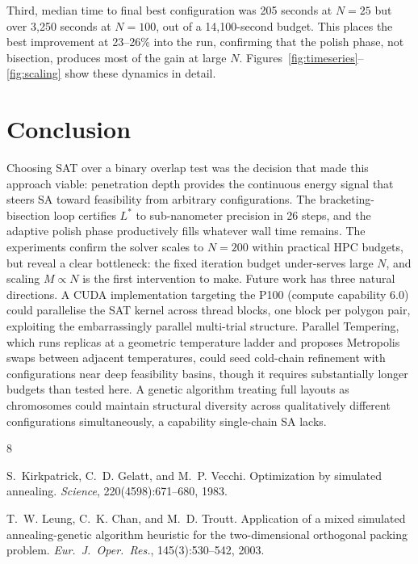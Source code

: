 \documentclass[10pt,twocolumn]{article}
\begin{document}
Third, median time to final best configuration was 205 seconds at
$N = 25$ but over 3{,}250 seconds at $N = 100$, out of a 14{,}100-second
budget. This places the best improvement at 23--26\% into the run,
confirming that the polish phase, not bisection, produces most of the
gain at large $N$. Figures~\ref{fig:timeseries}--\ref{fig:scaling}
show these dynamics in detail.

\section{Conclusion}
\label{sec:conclusion}

Choosing SAT over a binary overlap test was the decision that made this
approach viable: penetration depth provides the continuous energy
signal that steers SA toward feasibility from arbitrary configurations.
The bracketing-bisection loop certifies $L^*$ to sub-nanometer
precision in 26 steps, and the adaptive polish phase productively fills
whatever wall time remains. The experiments confirm the solver scales
to $N = 200$ within practical HPC budgets, but reveal a clear
bottleneck: the fixed iteration budget under-serves large $N$, and
scaling $M \propto N$ is the first intervention to make. Future work
has three natural directions. A CUDA implementation targeting the P100
(compute capability 6.0) could parallelise the SAT kernel across
thread blocks, one block per polygon pair, exploiting the
embarrassingly parallel multi-trial structure. Parallel Tempering,
which runs replicas at a geometric temperature ladder and proposes
Metropolis swaps between adjacent temperatures, could seed cold-chain
refinement with configurations near deep feasibility basins, though it
requires substantially longer budgets than tested here. A genetic
algorithm treating full layouts as chromosomes could maintain
structural diversity across qualitatively different configurations
simultaneously, a capability single-chain SA lacks.


\begin{thebibliography}{8}

S.~Kirkpatrick, C.~D. Gelatt, and M.~P. Vecchi.
Optimization by simulated annealing.
\textit{Science}, 220(4598):671--680, 1983.


T.~W. Leung, C.~K. Chan, and M.~D. Troutt.
Application of a mixed simulated annealing-genetic algorithm heuristic
for the two-dimensional orthogonal packing problem.
\textit{Eur.\ J.\ Oper.\ Res.}, 145(3):530--542, 2003.


\end{thebibliography}
\end{document}
